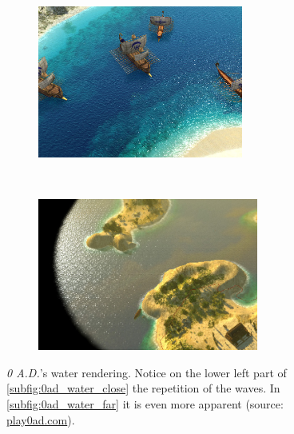 \begin{figure}[h!]
    \centering
    \begin{subfigure}[h]{\textwidth}
        \centering
        \includegraphics[height=5cm]{figures/0ad_water-specular.jpg}
        \label{subfig:0ad_water_close}
    \end{subfigure}\\%
    \begin{subfigure}[h]{\textwidth}
        \centering
        \includegraphics[height=5cm]{figures/0ad_cycladic_arcgipelago_6.jpg}
        \label{subfig:0ad_water_far}
    \end{subfigure}
    \caption{\textit{0 A.D.}'s water rendering. Notice on the lower left part
        of \autoref{subfig:0ad_water_close} the repetition of the waves.
        In \autoref{subfig:0ad_water_far} it is even more apparent (source:
        \url{play0ad.com}).}\label{fig:0ad_water}
\end{figure}
